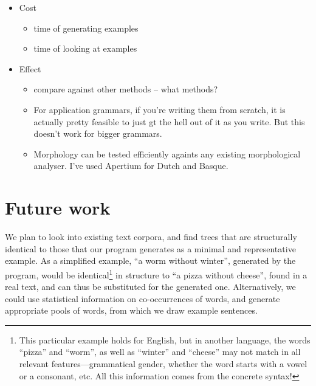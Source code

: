\begin{itemize}
\item Cost
  \begin{itemize}
  \item time of generating examples
  \item time of looking at examples
  \end{itemize}

\item Effect
  \begin{itemize}
  \item compare against other methods -- what methods?
  \item For application grammars, if you're writing them from scratch, it is actually pretty feasible to just gt the hell out of it as you write. But this doesn't work for bigger grammars.
  \item Morphology can be tested efficiently againts any existing morphological analyser. I've used Apertium for Dutch and Basque.
  \end{itemize}
\end{itemize}


\section{Future work}

We plan to look into existing text corpora, and find trees that are
structurally identical  to those that our program generates as a
minimal and representative example. As a simplified example, ``a worm
without winter'', generated by the program, would be identical\footnote{This particular example holds for English, but in another language, the words ``pizza'' and ``worm'', as well as ``winter'' and ``cheese'' may not match in all relevant features---grammatical gender, whether the word starts with a vowel or a consonant, etc. All this information comes from the concrete syntax!} 
in structure to ``a pizza without cheese'', found in a real text, and
can thus be substituted for the generated one.   
Alternatively, we could use statistical information on co-occurrences
of words, and generate appropriate pools of words, from which we draw
example sentences. 
